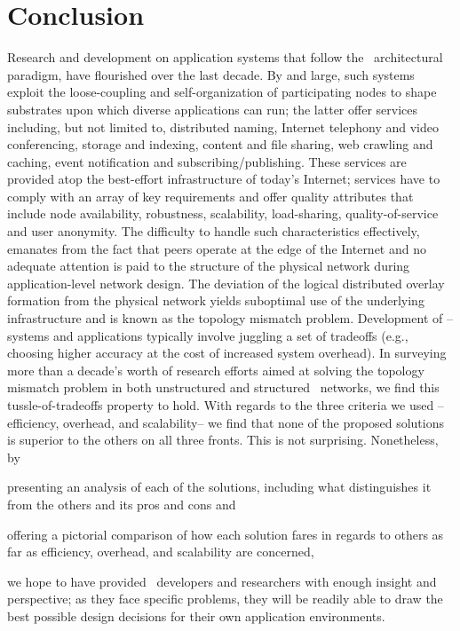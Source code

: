 \section{Conclusion}
\label{section:conclusion}

Research and development on application systems that follow the 
\p\ architectural paradigm, have flourished over the last decade.
By and large, such systems exploit the loose-coupling and self-organization 
of participating nodes to shape substrates upon which diverse applications 
can run; the latter offer services including, but not limited to, 
distributed naming, 
Internet telephony and video conferencing, 
storage and indexing, 
content and file sharing, 
web crawling and caching, 
event notification and subscribing/publishing.
These services are provided atop the 
best-effort infrastructure of today's Internet;
services have to comply with an array of key requirements and 
offer quality attributes that include node availability, robustness,
scalability, load-sharing, quality-of-service and user anonymity.
The difficulty to handle such characteristics effectively, 
emanates from the fact that
peers  operate at the edge of the Internet and no 
adequate attention is paid to the structure of the physical network 
during application-level network design. 
The deviation of the logical distributed overlay formation from the 
physical network yields suboptimal use of the underlying 
infrastructure and is known as the topology mismatch
problem.
Development of \p--systems and applications
typically involve juggling a set of tradeoffs (e.g.,
choosing higher accuracy at the cost of increased system overhead).
In surveying more than
a decade's worth of research efforts aimed at solving the topology mismatch
problem in both unstructured and structured \p\ networks, we find this
tussle-of-tradeoffs property to hold.  
With regards to the three criteria we used --efficiency,
overhead, and scalability-- we find that none of the proposed solutions 
is superior to the others on all three fronts.  This is not surprising.
Nonetheless, by
\begin{inparaenum}
  \item presenting an analysis of each of the solutions,
including what distinguishes it from the
others and its pros and cons and
  \item offering a pictorial
comparison of how each solution fares in regards to others as far as
efficiency, overhead, and scalability are concerned,
\end{inparaenum}
we hope to have provided \p\
developers and researchers with enough insight and perspective;
as they face specific problems, they will be readily able to 
draw the best possible design decisions for their own application
environments.